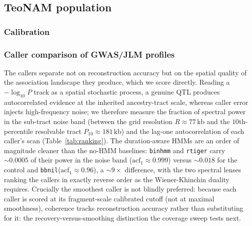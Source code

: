 \documentclass[9pt,twocolumn,twoside]{rilabRxiv}
\newcommand{\bbnil}{\texttt{bbnil}\xspace}
\newcommand{\rtiger}{\texttt{rtiger}\xspace}
\newcommand{\binhmm}{\texttt{binhmm}\xspace}
\begin{document}
\subsection{TeoNAM population}

\subsubsection{Calibration}

\subsubsection{Caller comparison of GWAS/JLM profiles}
The callers separate not on reconstruction accuracy but on the spatial quality of the
association landscape they produce, which we score directly. Reading a $-\log_{10}P$ track as a spatial
stochastic process, a genuine QTL produces autocorrelated evidence at the inherited
ancestry-tract scale, whereas caller error injects high-frequency noise; we therefore
measure the fraction of spectral power in the sub-tract noise band (between the grid
resolution $R\approx77$\,kb and the $10$th-percentile resolvable tract
$P_{10}\approx181$\,kb) and the lag-one autocorrelation of each caller's scan
(Table~\ref{tab:ranking}). The duration-aware HMMs are an order of magnitude cleaner
than the no-HMM baselines: \binhmm and \rtiger carry ${\sim}0.0005$ of their power in
the noise band ($\mathrm{acf}_1\approx0.999$) versus ${\sim}0.018$ for the control and
\bbnil ($\mathrm{acf}_1\approx0.96$), a ${\sim}9\times$ difference, with the two
spectral lenses ranking the callers in exactly reverse order as the
Wiener-Khinchin duality requires. Crucially the smoothest caller is not blindly
preferred: because each caller is scored at its fragment-scale calibrated cutoff (not
at maximal smoothness), coherence tracks reconstruction accuracy rather than
substituting for it: the recovery-versus-smoothing distinction the coverage sweep
tests next.
\end{document}
